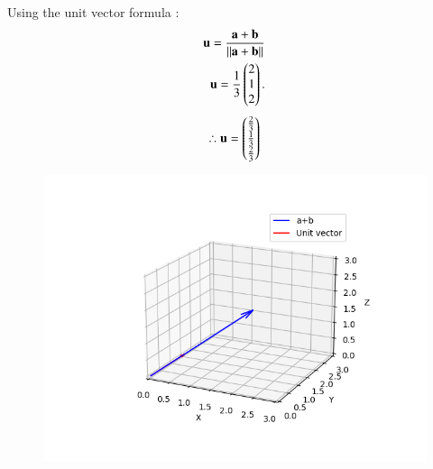 \documentclass[journal]{article}
\begin{document}
Using the unit vector formula :
\begin{align}
\mathbf{u} = \frac{\mathbf{a}+\mathbf{b}}{\|\mathbf{a}+\mathbf{b}\|}\\
\mathbf{u}= \frac{1}{3} \begin{pmatrix} 2 \\ 1 \\ 2 \end{pmatrix}.
\end{align}
\begin{align}
\therefore
\mathbf{u} = \begin{pmatrix}\frac{2}{3} \\  \frac{1}{3} \\ \frac{2}{3} \end{pmatrix}
\end{align}
\newpage
\begin{figure}
    \centering
    \includegraphics[width=1.0\linewidth]{fig-1.png}
    \caption{}
    \label{fig:placeholder}
\end{figure}
\end{document}
